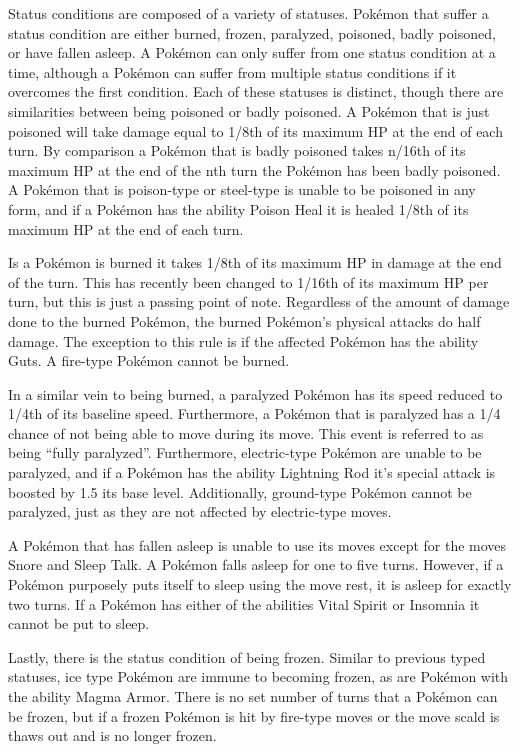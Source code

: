 \documentclass[12pt,twoside]{reedthesis}
\begin{document}
  Status conditions are composed of a variety of statuses. Pokémon that
  suffer a status condition are either burned, frozen, paralyzed,
  poisoned, badly poisoned, or have fallen asleep. A Pokémon can only
  suffer from one status condition at a time, although a Pokémon can
  suffer from multiple status conditions if it overcomes the first
  condition. Each of these statuses is distinct, though there are
  similarities between being poisoned or badly poisoned. A Pokémon that is
  just poisoned will take damage equal to 1/8th of its maximum HP at the
  end of each turn. By comparison a Pokémon that is badly poisoned takes
  n/16th of its maximum HP at the end of the nth turn the Pokémon has been
  badly poisoned. A Pokémon that is poison-type or steel-type is unable to
  be poisoned in any form, and if a Pokémon has the ability Poison Heal it
  is healed 1/8th of its maximum HP at the end of each turn.
  
  Is a Pokémon is burned it takes 1/8th of its maximum HP in damage at the
  end of the turn. This has recently been changed to 1/16th of its maximum
  HP per turn, but this is just a passing point of note. Regardless of the
  amount of damage done to the burned Pokémon, the burned Pokémon's
  physical attacks do half damage. The exception to this rule is if the
  affected Pokémon has the ability Guts. A fire-type Pokémon cannot be
  burned.
  
  In a similar vein to being burned, a paralyzed Pokémon has its speed
  reduced to 1/4th of its baseline speed. Furthermore, a Pokémon that is
  paralyzed has a 1/4 chance of not being able to move during its move.
  This event is referred to as being ``fully paralyzed''. Furthermore,
  electric-type Pokémon are unable to be paralyzed, and if a Pokémon has
  the ability Lightning Rod it's special attack is boosted by 1.5 its base
  level. Additionally, ground-type Pokémon cannot be paralyzed, just as
  they are not affected by electric-type moves.
  
  A Pokémon that has fallen asleep is unable to use its moves except for
  the moves Snore and Sleep Talk. A Pokémon falls asleep for one to five
  turns. However, if a Pokémon purposely puts itself to sleep using the
  move rest, it is asleep for exactly two turns. If a Pokémon has either
  of the abilities Vital Spirit or Insomnia it cannot be put to sleep.
  
  Lastly, there is the status condition of being frozen. Similar to
  previous typed statuses, ice type Pokémon are immune to becoming frozen,
  as are Pokémon with the ability Magma Armor. There is no set number of
  turns that a Pokémon can be frozen, but if a frozen Pokémon is hit by
  fire-type moves or the move scald is thaws out and is no longer frozen.
  
\end{document}
